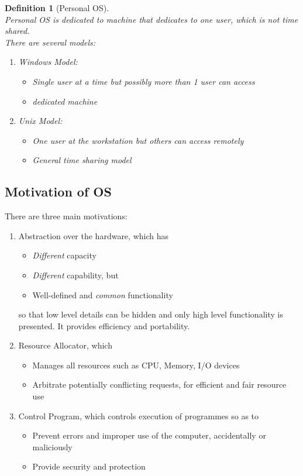 \documentclass[12pt]{article}
\newtheorem{definition}{Definition}[section]
\theoremstyle{definition}
\begin{document}
\begin{definition}[Personal OS]
\hfill\\\normalfont Personal OS is dedicated to machine that dedicates to one user, which is not time shared.\\
There are several models:
\begin{enumerate}
  \item Windows Model:
  \begin{itemize}
    \item Single user at a time but possibly more than 1 user can access
    \item dedicated machine
  \end{itemize}
  \item Unix Model:
  \begin{itemize}
    \item One user at the workstation but others can access remotely
    \item General time sharing model
  \end{itemize}
\end{enumerate}
\end{definition}
\subsection{Motivation of OS}
There are three main motivations:
\begin{enumerate}
  \item Abstraction over the hardware, which has
  \begin{itemize}
    \item \textit{Different} capacity
    \item \textit{Different} capability, but
    \item Well-defined and \textit{common} functionality
  \end{itemize}
  so that low level details can be hidden and only high level functionality is presented. It provides efficiency and portability.
  \item Resource Allocator, which 
  \begin{itemize}
    \item Manages all resources such as CPU, Memory, I/O devices
    \item Arbitrate potentially conflicting requests, for efficient and fair resource use
  \end{itemize}
  \item Control Program, which controls execution of programmes so as to 
  \begin{itemize}
    \item Prevent errors and improper use of the computer, accidentally or maliciously
    \item Provide security and protection
  \end{itemize}
\end{enumerate}
\end{document}
